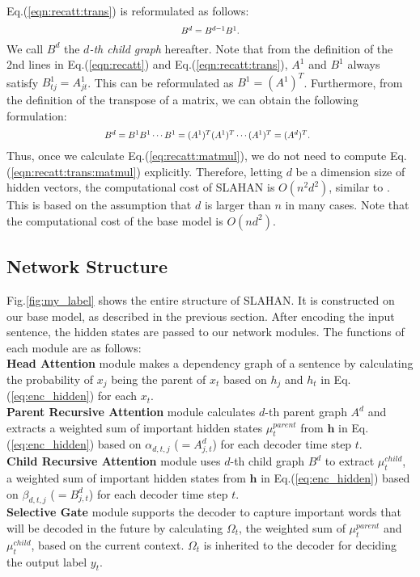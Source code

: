 \documentclass[letterpaper]{article} \usepackage{aaai20}  \usepackage{times}  \usepackage{helvet} \usepackage{courier}  \usepackage[hyphens]{url}  \usepackage{graphicx} \urlstyle{rm} \def\UrlFont{\rm}  \usepackage{graphicx}  \frenchspacing  \setlength{\pdfpagewidth}{8.5in}  \setlength{\pdfpageheight}{11in}  \usepackage{tabu}
\newcommand{\newcite}[1]{\citeauthor{#1} \shortcite{#1}}
\begin{document}
Eq.(\ref{eqn:recatt:trans}) is reformulated as follows:
\begin{equation}
    \scalebox{0.8}{$
    B^{d} = B^{d-1}B^{1}.
    $}
    \label{eqn:recatt:trans:matmul}
\end{equation}
We call $B^{d}$ the \textit{$d$-th child graph} hereafter.
Note that from the definition of the 2nd lines in Eq.(\ref{eqn:recatt}) and Eq.(\ref{eqn:recatt:trans}), $A^{1}$ and $B^{1}$ always satisfy $B^{1}_{tj} = A^{1}_{jt}$. This can be reformulated as $B^{1}=(A^{1})^{T}$.
Furthermore, from the definition of the transpose of a matrix, we can obtain the following formulation:
\begin{equation}
    \scalebox{0.8}{$
    \!\!\!\!\!\!\!\! B^{d} = B^{1}B^{1} \cdots B^{1} = (A^{1})^{T}(A^{1})^{T} \cdots (A^{1})^{T} = (A^{d})^{T}. \!\!\!\!
    $}
\end{equation}
Thus, once we calculate Eq.(\ref{eq:recatt:matmul}), we do not need to compute Eq.(\ref{eqn:recatt:trans:matmul}) explicitly.
Therefore, letting $d$ be a dimension size of hidden vectors, the computational cost of SLAHAN is $O(n^2d^2)$, similar to \newcite{kamigaito-etal-2018-higher}.
This is based on the assumption that $d$ is larger than $n$ in many cases.
Note that the computational cost of the base model is $O(nd^2)$. 

\subsection{Network Structure}
Fig.\ref{fig:my_label} shows the entire structure of SLAHAN.
It is constructed on our base model, as described in the previous section.
After encoding the input sentence, the hidden states are passed to our network modules.
The functions of each module are as follows:\\
{\bf Head Attention} module makes a dependency graph of a sentence by calculating the probability of $x_{j}$ being the parent of $x_{t}$ based on $h_{j}$ and $h_{t}$ in Eq.(\ref{eq:enc_hidden}) for each $x_{t}$. \\
{\bf Parent Recursive Attention} module calculates $d$-th parent graph $A^{d}$ and extracts a weighted sum of important hidden states $\mu^{parent}_{t}$ from $\mathbf{h}$ in Eq.(\ref{eq:enc_hidden}) based on $\alpha_{d,t,j}$ ($=A^{d}_{j,t}$) for each decoder time step $t$. \\
{\bf Child Recursive Attention} module uses $d$-th child graph $B^{d}$ to extract $\mu^{child}_{t}$, a weighted sum of important hidden states from $\mathbf{h}$ in Eq.(\ref{eq:enc_hidden}) based on $\beta_{d,t,j}$ ($=B^{d}_{j,t}$) for each decoder time step $t$. \\
{\bf Selective Gate} module supports the decoder to capture important words that will be decoded in the future by calculating $\Omega_{t}$, the weighted sum of $\mu^{parent}_{t}$ and $\mu^{child}_{t}$, based on the current context. $\Omega_{t}$ is inherited to the decoder for deciding the output label $y_{t}$. 
\end{document}
